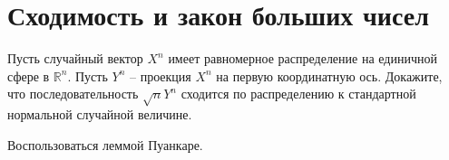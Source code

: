 \section{Сходимость и закон больших чисел}

\begin{problem}
Пусть случайный вектор $X^{n} $ имеет равномерное распределение на единичной сфере в ${\mathbb R}^{n} $. Пусть $Y^{n} $ -- проекция $X^{n} $ на первую координатную ось. Докажите, что последовательность $\sqrt{n} Y^{n} $ сходится по распределению к стандартной нормальной случайной величине.

\begin{ordre} 
 Воспользоваться леммой Пуанкаре.
\end{ordre}
\end{problem}

